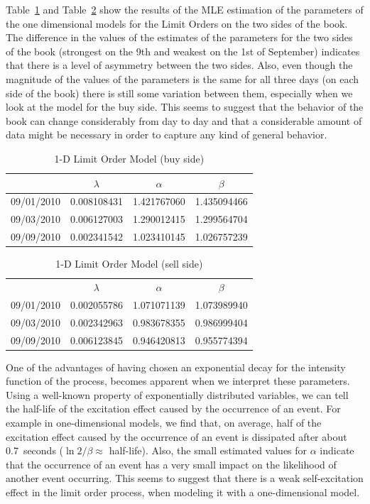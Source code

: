 Table~\ref{tab:limmodbuy} and Table~\ref{tab:limmodsell} show the results of the MLE estimation of the parameters of the one dimensional models for the Limit Orders on the two sides of the book. The difference in the values of the estimates of the parameters for the two sides of the book (strongest on the 9th and weakest on the 1st of September) indicates that there is a level of asymmetry between the two sides. Also, even though the magnitude of the values of the parameters is the same for all three days (on each side of the book) there is still some variation between them, especially when we look at the model for the buy side. This seems to suggest that the behavior of the book can change considerably from day to day and that a considerable amount of data might be necessary in order to capture any kind of general behavior. 
	\begin{table}[!htbp]
	\centering
	\caption{1-D Limit Order Model (buy side)\label{tab:limmodbuy}}
	\begin{tabular}{c|ccc} 
		& $\lambda$ & $\alpha$  & $\beta$ \\ \hline
	09/01/2010 & 0.008108431 & 1.421767060 & 1.435094466 \\
	09/03/2010 & 0.006127003 & 1.290012415 & 1.299564704 \\
	09/09/2010 & 0.002341542 & 1.023410145 & 1.026757239
	\end{tabular}
	\end{table}
	\begin{table}
	\centering
	\caption{1-D Limit Order Model (sell side) \label{tab:limmodsell}}
	\begin{tabular}{c|ccc} 
		& $\lambda$ & $\alpha$ & $\beta$ \\
	09/01/2010 & 0.002055786 & 1.071071139 & 1.073989940 \\
	09/03/2010 & 0.002342963 & 0.983678355 & 0.986999404 \\
	09/09/2010 & 0.006123845 & 0.946420813 & 0.955774394
	\end{tabular}
	\end{table}


One of the advantages of having chosen an exponential decay for the intensity function of the process, becomes apparent when we interpret these parameters. Using a well-known property of exponentially distributed variables, we can tell the half-life of the excitation effect caused by the occurrence of an event. For example in one-dimensional models, we find that, on average, half of the excitation effect caused by the occurrence of an event is dissipated after about 0.7~seconds ($\ln 2/\beta \approx$ half-life). Also, the small estimated values for $\alpha$ indicate that the occurrence of an event has a very small impact on the likelihood of another event occurring. This seems to suggest that there is a weak self-excitation effect in the limit order process, when modeling it with a one-dimensional model. 


